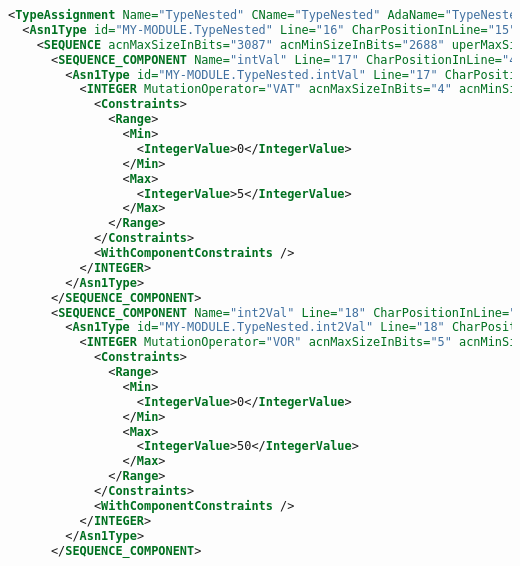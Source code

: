 
\begin{minipage}{15cm}
\begin{lstlisting}[language=XML, caption=Portion of an XML ASN1 grammar., label=asnXMLUpdated, mathescape=true]
<TypeAssignment Name="TypeNested" CName="TypeNested" AdaName="TypeNested" Line="16" CharPositionInLine="0">
  <Asn1Type id="MY-MODULE.TypeNested" Line="16" CharPositionInLine="15" ParameterizedTypeInstance="false">
    <SEQUENCE acnMaxSizeInBits="3087" acnMinSizeInBits="2688" uperMaxSizeInBits="3087" uperMinSizeInBits="528">
      <SEQUENCE_COMPONENT Name="intVal" Line="17" CharPositionInLine="4" AdaName="intVal" CName="intVal">
        <Asn1Type id="MY-MODULE.TypeNested.intVal" Line="17" CharPositionInLine="11" ParameterizedTypeInstance="false">
          <INTEGER MutationOperator="VAT" acnMaxSizeInBits="4" acnMinSizeInBits="4" uperMaxSizeInBits="4" uperMinSizeInBits="4">
            <Constraints>
              <Range>
                <Min>
                  <IntegerValue>0</IntegerValue>
                </Min>
                <Max>
                  <IntegerValue>5</IntegerValue>
                </Max>
              </Range>
            </Constraints>
            <WithComponentConstraints />
          </INTEGER>
        </Asn1Type>
      </SEQUENCE_COMPONENT>
      <SEQUENCE_COMPONENT Name="int2Val" Line="18" CharPositionInLine="4" AdaName="int2Val" CName="int2Val">
        <Asn1Type id="MY-MODULE.TypeNested.int2Val" Line="18" CharPositionInLine="12" ParameterizedTypeInstance="false">
          <INTEGER MutationOperator="VOR" acnMaxSizeInBits="5" acnMinSizeInBits="5" uperMaxSizeInBits="5" uperMinSizeInBits="5">
            <Constraints>
              <Range>
                <Min>
                  <IntegerValue>0</IntegerValue>
                </Min>
                <Max>
                  <IntegerValue>50</IntegerValue>
                </Max>
              </Range>
            </Constraints>
            <WithComponentConstraints />
          </INTEGER>
        </Asn1Type>
      </SEQUENCE_COMPONENT>
\end{lstlisting}
\end{minipage}

